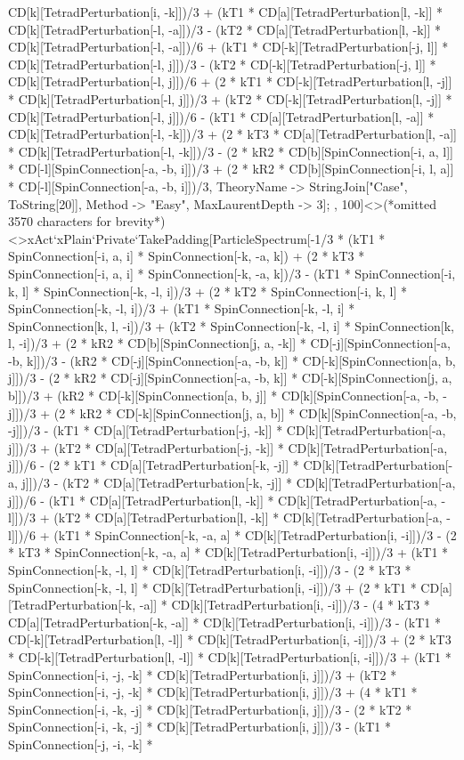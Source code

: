 CD[k][TetradPerturbation[i, -k]])/3 + (kT1 * CD[a][TetradPerturbation[l, -k]] * CD[k][TetradPerturbation[-l, -a]])/3 - (kT2 * CD[a][TetradPerturbation[l, -k]] * CD[k][TetradPerturbation[-l, -a]])/6 + (kT1 * CD[-k][TetradPerturbation[-j, l]] * CD[k][TetradPerturbation[-l, j]])/3 - (kT2 * CD[-k][TetradPerturbation[-j, l]] * CD[k][TetradPerturbation[-l, j]])/6 + (2 * kT1 * CD[-k][TetradPerturbation[l, -j]] * CD[k][TetradPerturbation[-l, j]])/3 + (kT2 * CD[-k][TetradPerturbation[l, -j]] * CD[k][TetradPerturbation[-l, j]])/6 - (kT1 * CD[a][TetradPerturbation[l, -a]] * CD[k][TetradPerturbation[-l, -k]])/3 + (2 * kT3 * CD[a][TetradPerturbation[l, -a]] * CD[k][TetradPerturbation[-l, -k]])/3 - (2 * kR2 * CD[b][SpinConnection[-i, a, l]] * CD[-l][SpinConnection[-a, -b, i]])/3 + (2 * kR2 * CD[b][SpinConnection[-i, l, a]] * CD[-l][SpinConnection[-a, -b, i]])/3, TheoryName -> StringJoin["Case", ToString[20]], Method -> "Easy", MaxLaurentDepth -> 3]; , 100]<>(*omitted 3570 characters for brevity*)<>xAct`xPlain`Private`TakePadding[ParticleSpectrum[-1/3 * (kT1 * SpinConnection[-i, a, i] * SpinConnection[-k, -a, k]) + (2 * kT3 * SpinConnection[-i, a, i] * SpinConnection[-k, -a, k])/3 - (kT1 * SpinConnection[-i, k, l] * SpinConnection[-k, -l, i])/3 + (2 * kT2 * SpinConnection[-i, k, l] * SpinConnection[-k, -l, i])/3 + (kT1 * SpinConnection[-k, -l, i] * SpinConnection[k, l, -i])/3 + (kT2 * SpinConnection[-k, -l, i] * SpinConnection[k, l, -i])/3 + (2 * kR2 * CD[b][SpinConnection[j, a, -k]] * CD[-j][SpinConnection[-a, -b, k]])/3 - (kR2 * CD[-j][SpinConnection[-a, -b, k]] * CD[-k][SpinConnection[a, b, j]])/3 - (2 * kR2 * CD[-j][SpinConnection[-a, -b, k]] * CD[-k][SpinConnection[j, a, b]])/3 + (kR2 * CD[-k][SpinConnection[a, b, j]] * CD[k][SpinConnection[-a, -b, -j]])/3 + (2 * kR2 * CD[-k][SpinConnection[j, a, b]] * CD[k][SpinConnection[-a, -b, -j]])/3 - (kT1 * CD[a][TetradPerturbation[-j, -k]] * CD[k][TetradPerturbation[-a, j]])/3 + (kT2 * CD[a][TetradPerturbation[-j, -k]] * CD[k][TetradPerturbation[-a, j]])/6 - (2 * kT1 * CD[a][TetradPerturbation[-k, -j]] * CD[k][TetradPerturbation[-a, j]])/3 - (kT2 * CD[a][TetradPerturbation[-k, -j]] * CD[k][TetradPerturbation[-a, j]])/6 - (kT1 * CD[a][TetradPerturbation[l, -k]] * CD[k][TetradPerturbation[-a, -l]])/3 + (kT2 * CD[a][TetradPerturbation[l, -k]] * CD[k][TetradPerturbation[-a, -l]])/6 + (kT1 * SpinConnection[-k, -a, a] * CD[k][TetradPerturbation[i, -i]])/3 - (2 * kT3 * SpinConnection[-k, -a, a] * CD[k][TetradPerturbation[i, -i]])/3 + (kT1 * SpinConnection[-k, -l, l] * CD[k][TetradPerturbation[i, -i]])/3 - (2 * kT3 * SpinConnection[-k, -l, l] * CD[k][TetradPerturbation[i, -i]])/3 + (2 * kT1 * CD[a][TetradPerturbation[-k, -a]] * CD[k][TetradPerturbation[i, -i]])/3 - (4 * kT3 * CD[a][TetradPerturbation[-k, -a]] * CD[k][TetradPerturbation[i, -i]])/3 - (kT1 * CD[-k][TetradPerturbation[l, -l]] * CD[k][TetradPerturbation[i, -i]])/3 + (2 * kT3 * CD[-k][TetradPerturbation[l, -l]] * CD[k][TetradPerturbation[i, -i]])/3 + (kT1 * SpinConnection[-i, -j, -k] * CD[k][TetradPerturbation[i, j]])/3 + (kT2 * SpinConnection[-i, -j, -k] * CD[k][TetradPerturbation[i, j]])/3 + (4 * kT1 * SpinConnection[-i, -k, -j] * CD[k][TetradPerturbation[i, j]])/3 - (2 * kT2 * SpinConnection[-i, -k, -j] * CD[k][TetradPerturbation[i, j]])/3 - (kT1 * SpinConnection[-j, -i, -k] * 